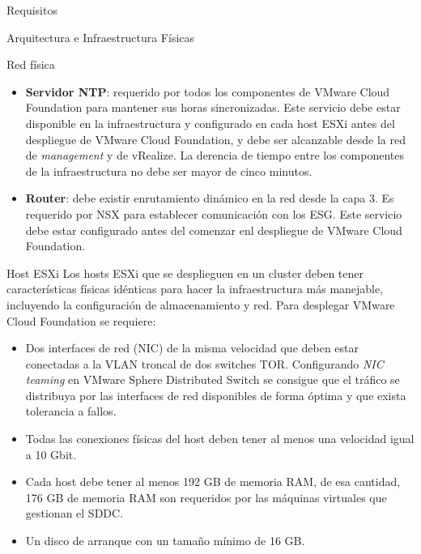 \begin{section}{Requisitos}
\begin{subsection}{Arquitectura e Infraestructura Físicas \cite{CFfisInfraestuctura}}
\begin{subsubsection}{Red física}
\begin{itemize}
    \item \textbf{Servidor NTP}: requerido por todos los componentes de VMware Cloud Foundation para mantener sus horas sincronizadas. Este servicio debe estar disponible en la infraestructura y configurado en cada host ESXi antes del despliegue de VMware Cloud Foundation, y debe ser alcanzable desde la red de \textit{management} y de vRealize. La derencia de tiempo entre los componentes de la infraestructura no debe ser mayor de cinco minutos.
    
    \item \textbf{Router}: debe existir enrutamiento dinámico en la red desde la capa 3. Es requerido por NSX para establecer comunicación con los ESG. Este servicio debe estar configurado antes del comenzar enl despliegue de VMware Cloud Foundation. 
\end{itemize}

\end{subsubsection}


\begin{subsubsection}{Host ESXi\cite{WDminRequierements}}
Los hosts ESXi que se desplieguen en un cluster deben tener características físicas idénticas para hacer la infraestructura más manejable,  incluyendo la configuración de almacenamiento y red. Para desplegar VMware Cloud Foundation se requiere:
\begin{itemize}
    \item  Dos interfaces de red (NIC) de la misma velocidad que deben estar conectadas a la VLAN troncal de dos switches TOR. Configurando \textit{NIC teaming} en VMware Sphere Distributed Switch se consigue que el tráfico se distribuya por las interfaces de red disponibles de forma óptima y que exista tolerancia a fallos.
    \item Todas las conexiones físicas del host deben tener al menos una velocidad igual a 10 Gbit.
    \item Cada host debe tener al menos 192 GB de memoria RAM, de esa cantidad, 176 GB de memoria RAM son requeridos por las máquinas virtuales que gestionan el SDDC.
    \item Un disco de arranque con un tamaño mínimo de 16 GB.
\end{itemize}

\end{subsubsection}



\end{subsection}
\end{section}
